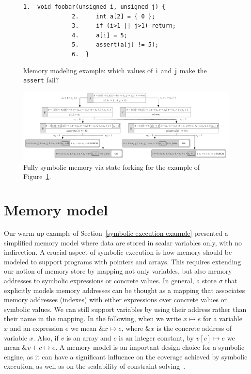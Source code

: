 
\begin{figure}[t]
\begin{lstlisting}[basicstyle=\ttfamily\small]
              1.  void foobar(unsigned i, unsigned j) {
              2.     int a[2] = { 0 };
              3.     if (i>1 || j>1) return;
              4.     a[i] = 5;
              5.     assert(a[j] != 5);
              6.  }
\end{lstlisting}
\caption{Memory modeling example: which values of \texttt{i} and \texttt{j} make the \texttt{assert} fail?}
\label{fi:example-mem}
\end{figure}

\begin{figure}
\includegraphics[width=1\columnwidth]{images/memory-fork} 
\caption{Fully symbolic memory via state forking for the example of Figure~\ref{fi:example-mem}.}
\label{fi:memory-fork}
\end{figure}


\section{Memory model}
\label{memory-model}

Our warm-up example of Section~\ref{symbolic-execution-example} presented a simplified memory model where data are stored in scalar variables only, with no indirection. A crucial aspect of symbolic execution is how memory should be modeled to support programs with pointers and arrays. This requires extending our notion of memory store by mapping not only variables, but also memory addresses to symbolic expressions or concrete values. In general, a store $\sigma$ that explicitly models memory addresses can be thought as a mapping that associates memory addresses (indexes) with either expressions over concrete values or symbolic values. We can still support variables by using their address rather than their name in the mapping. In the following, when we write $x\mapsto e$ for a variable $x$ and an expression $e$ we mean $\&x\mapsto e$, where $\&x$ is the concrete address of variable $x$. Also, if $v$ is an array and $c$ is an integer constant, by $v[c]\mapsto e$ we mean $\&v+c\mapsto e$. A memory model is an important design choice for a symbolic engine, as it can have a significant influence on the coverage achieved by symbolic execution, as well as on the scalability of constraint solving~\cite{CS-CACM13}.


